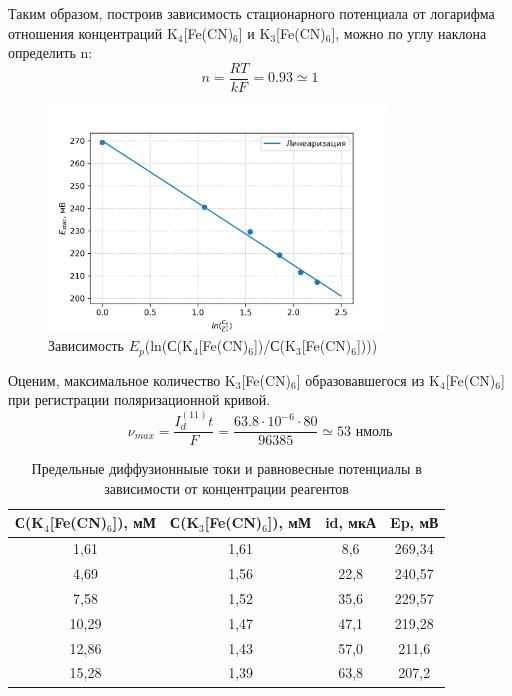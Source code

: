 \documentclass[a4paper, 12pt]{article}
\begin{document}
Таким образом, построив зависимость стационарного потенциала от логарифма отношения концентраций K$_4$[Fe(CN)$_6$] и K$_3$[Fe(CN)$_6$], можно по углу наклона определить n:
$$
n=\frac{R T}{k F}=0.93 \simeq 1
$$

\begin{figure}[h!]
    \begin{center}
    \includegraphics[width=0.8\textwidth]{U.png}
    \end{center}
    \caption{Зависимость $E_{p}$(ln(С(K$_4$[Fe(CN)$_6$])/С(K$_3$[Fe(CN)$_6$])))}
\end{figure}

Оценим, максимальное количество K$_3$[Fe(CN)$_6$] образовавшегося из K$_4$[Fe(CN)$_6$] при регистрации поляризационной кривой. 
$$
\nu_{max} = \frac{I_d^{(11)} t}{F} = \frac{63.8 \cdot 10^{-6} \cdot 80}{96385} \simeq 53 \text{  нмоль}
$$

\begin{table}[h!]
\begin{center}
\caption{Предельные диффузионныые токи и равновесные потенциалы в зависимости от концентрации реагентов}
\begin{tabular}{|c|c|c|c|}
\hline
С(K$_4$[Fe(CN)$_6$]), мМ & С(K$_3$[Fe(CN)$_6$]), мМ & id,  мкА & Ep, мВ \\ \hline
1,61      & 1,61      & 8,6      & 269,34 \\ \hline
4,69      & 1,56      & 22,8     & 240,57 \\ \hline
7,58      & 1,52      & 35,6     & 229,57 \\ \hline
10,29     & 1,47      & 47,1     & 219,28 \\ \hline
12,86     & 1,43      & 57,0     & 211,6  \\ \hline
15,28     & 1,39      & 63,8     & 207,2  \\ \hline
\end{tabular}
\end{center}
\end{table}
\end{document}
